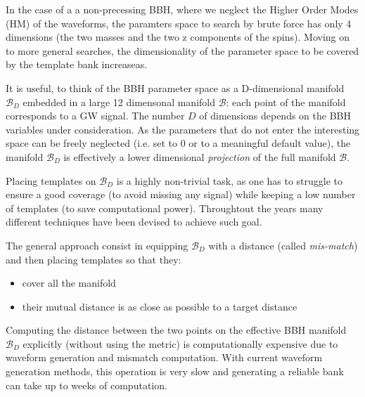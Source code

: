 \documentclass[twocolumn,showpacs,preprintnumbers,nofootinbib,prd,
superscriptaddress,10pt]{revtex4-2}
\renewcommand{\d}[1]{\ensuremath{\operatorname{d}\!{#1}}}
\begin{document}
In the case of a a non-precessing BBH, where we neglect the Higher Order Modes (HM) of the waveforms, the paramters space to search by brute force has only 4 dimensions (the two masses and the two z components of the spins).
Moving on to more general searches, the dimensionality of the parameter space to be covered by the template bank increaseas.

It is useful, to think of the BBH parameter space as a D-dimensional manifold $\mathcal{B}_D$ embedded in a large 12 dimensonal manifold $\mathcal{B}$: each point of the manifold corresponds to a GW signal. The number $D$ of dimensions depends on the BBH variables under consideration.
As the parameters that do not enter the interesting space can be freely neglected (i.e. set to $0$ or to a meaningful default value), the manifold $\mathcal{B}_D$ is effectively a lower dimensional {\it projection} of the full manifold $\mathcal{B}$.

Placing templates on $\mathcal{B}_D$ is a highly non-trivial task, as one has to struggle to ensure a good coverage (to avoid missing any signal) while keeping a low number of templates (to save computational power).
Throughtout the years many different techniques have been devised to achieve such goal.


The general approach consist in equipping $\mathcal{B}_D$ with a distance (called {\it mis-match}) and then placing templates so that they:
\begin{itemize}
	\item cover all the manifold
	\item their mutual distance is as close as possible to a target distance
\end{itemize}
Computing the distance between the two points on the effective BBH manifold $\mathcal{B}_D$ explicitly (without using the metric) is computationally expensive due to waveform generation and mismatch computation.
With current waveform generation methods, this operation is very slow and generating a reliable bank can take up to weeks of computation.
\end{document}
